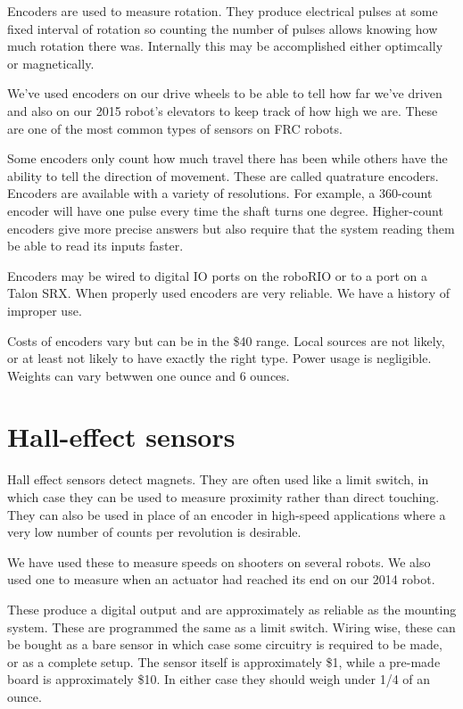 \documentclass{article}
\begin{document}
Encoders are used to measure rotation.  They produce electrical pulses at some fixed interval of rotation so counting the number of pulses allows knowing how much rotation there was.  Internally this may be accomplished either optimcally or magnetically.  

We've used encoders on our drive wheels to be able to tell how far we've driven and also on our 2015 robot's elevators to keep track of how high we are.  These are one of the most common types of sensors on FRC robots.

Some encoders only count how much travel there has been while others have the ability to tell the direction of movement.  These are called quatrature encoders.  Encoders are available with a variety of resolutions.  For example, a 360-count encoder will have one pulse every time the shaft turns one degree.  Higher-count encoders give more precise answers but also require that the system reading them be able to read its inputs faster.  

Encoders may be wired to digital IO ports on the roboRIO or to a port on a Talon SRX.  When properly used encoders are very reliable.  We have a history of improper use.  

Costs of encoders vary but can be in the \$40 range.  Local sources are not likely, or at least not likely to have exactly the right type.  Power usage is negligible.  Weights can vary betwwen one ounce and 6 ounces.  

\section{Hall-effect sensors}
Hall effect sensors detect magnets.  They are often used like a limit switch, in which case they can be used to measure proximity rather than direct touching.  They can also be used in place of an encoder in high-speed applications where a very low number of counts per revolution is desirable.  

We have used these to measure speeds on shooters on several robots.  We also used one to measure when an actuator had reached its end on our 2014 robot.  

These produce a digital output and are approximately as reliable as the mounting system.  These are programmed the same as a limit switch.  Wiring wise, these can be bought as a bare sensor in which case some circuitry is required to be made, or as a complete setup.  The sensor itself is approximately \$1, while a pre-made board is approximately \$10.  In either case they should weigh under 1/4 of an ounce.  
\end{document}
